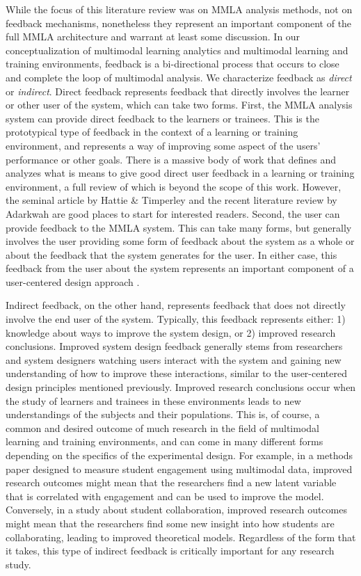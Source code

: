\documentclass[manuscript,screen,review]{acmart}
\begin{document}
While the focus of this literature review was on MMLA analysis methods, not on feedback mechanisms, nonetheless they represent an important component of the full MMLA architecture and warrant at least some discussion. In our conceptualization of multimodal learning analytics and multimodal learning and training environments, feedback is a bi-directional process that occurs to close and complete the loop of multimodal analysis. We characterize feedback as \textit{direct} or \textit{indirect}. Direct feedback represents feedback that directly involves the learner or other user of the system, which can take two forms. First, the MMLA analysis system can provide direct feedback to the learners or trainees. This is the prototypical type of feedback in the context of a learning or training environment, and represents a way of improving some aspect of the users' performance or other goals. There is a massive body of work that defines and analyzes what is means to give good direct user feedback in a learning or training environment, a full review of which is beyond the scope of this work. However, the seminal article by Hattie \& Timperley \cite{hattie2007} and the recent literature review by Adarkwah \cite{Adarkwah2021} are good places to start for interested readers. Second, the user can provide feedback to the MMLA system. This can take many forms, but generally involves the user providing some form of feedback about the system as a whole or about the feedback that the system generates for the user. In either case, this feedback from the user about the system represents an important component of a user-centered design approach \cite{abras2004user}.

Indirect feedback, on the other hand, represents feedback that does not directly involve the end user of the system. Typically, this feedback represents either: 1) knowledge about ways to improve the system design, or 2) improved research conclusions. Improved system design feedback generally stems from researchers and system designers watching users interact with the system and gaining new understanding of how to improve these interactions, similar to the user-centered design principles mentioned previously. Improved research conclusions occur when the study of learners and trainees in these environments leads to new understandings of the subjects and their populations. This is, of course, a common and desired outcome of much research in the field of multimodal learning and training environments, and can come in many different forms depending on the specifics of the experimental design. For example, in a methods paper designed to measure student engagement using multimodal data, improved research outcomes might mean that the researchers find a new latent variable that is correlated with engagement and can be used to improve the model. Conversely, in a study about student collaboration, improved research outcomes might mean that the researchers find some new insight into how students are collaborating, leading to improved theoretical models. Regardless of the form that it takes, this type of indirect feedback is critically important for any research study.
\end{document}
